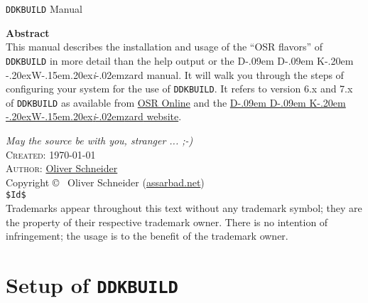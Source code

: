 \documentclass[a4paper,titlepage]{report}
\newcommand{\linkclr}[1]{\textcolor[rgb]{0.00,0.00,0.60}{#1}}
\newcommand{\extlink}[2]{\href{#1}{\linkclr{#2}}}
\def\ddkwiz{D\kern-.09em D\kern-.09em K\kern-.20em \raise-.20ex\hbox{W}\kern-.15em\raise.20ex\hbox{\it{i}}\kern-.02em{zard}}
\newcommand{\ddkbuild}[0]{\texttt{DDKBUILD}}
\newcounter{copyrightyear}
\begin{document}
\begin{titlepage}
\begin{center}
\large \ddkbuild{} Manual\\
\vskip 6.5cm
\begin{minipage}{\textwidth}
\textbf{Abstract}\\
This manual describes the installation and usage of the ``OSR flavors'' of \ddkbuild{} in
more detail than the help output or the \ddkwiz{} manual. It will walk you through the
steps of configuring your system for the use of \ddkbuild{}. It refers to version 6.x
and 7.x of \ddkbuild{} as available from \extlink{http://www.osronline.com}{OSR Online}
and the \extlink{http://ddkwizard.assarbad.net}{\ddkwiz{} website}.
\end{minipage}
\vskip 6.5cm
\textsf{{\emph{\textcolor[gray]{0.75}{May the source be with you, stranger ... ;-)}}}\\}
\vskip 1.0cm
\textsc{Created:} \isodate\today\\
\textsc{Author:} \href{http://assarbad.net/en/contact}{Oliver Schneider}\\
\vskip 0.7cm
Copyright \copyright\hspace{0.1ex}~ Oliver Schneider (\textsf{\href{http://assarbad.net}{\linkclr{assarbad.net}}})\\
{\small\color{gray}\verb+$Id$+}\\

\addvspace{0.5cm}
{\small\color{gray}\textsf{Trademarks appear throughout this text
without any trademark symbol; they are the property of their respective
trademark owner. There is no intention of infringement; the usage is to
the benefit of the trademark owner.}}
\end{center}
\end{titlepage}
\chapter{Setup of \texttt{DDKBUILD}}\thispagestyle{fancy}
\end{document}

